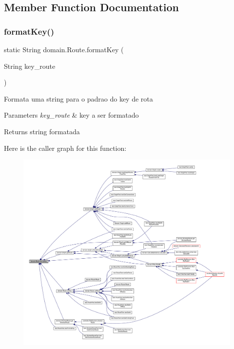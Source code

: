 \subsection{Member Function Documentation}
\mbox{\label{classdomain_1_1_route_a750d0fa997e2a369cd6721316df90adf}} 
\subsubsection{\texorpdfstring{format\+Key()}{formatKey()}}
{\footnotesize\ttfamily static String domain.\+Route.\+format\+Key (\begin{DoxyParamCaption}\item[{String}]{key\+\_\+route }\end{DoxyParamCaption})\hspace{0.3cm}{\ttfamily [static]}}

Formata uma string para o padrao do key de rota


\begin{DoxyParams}{Parameters}
{\em key\+\_\+route} & key a ser formatado \\
\hline
\end{DoxyParams}
\begin{DoxyReturn}{Returns}
string formatada 
\end{DoxyReturn}
Here is the caller graph for this function\+:\nopagebreak
\begin{figure}[H]
\begin{center}
\leavevmode
\includegraphics[width=350pt]{classdomain_1_1_route_a750d0fa997e2a369cd6721316df90adf_icgraph}
\end{center}
\end{figure}
\mbox{\label{classdomain_1_1_route_a39e1f65aa6930a75d8b8edb73fb06f02}} 
